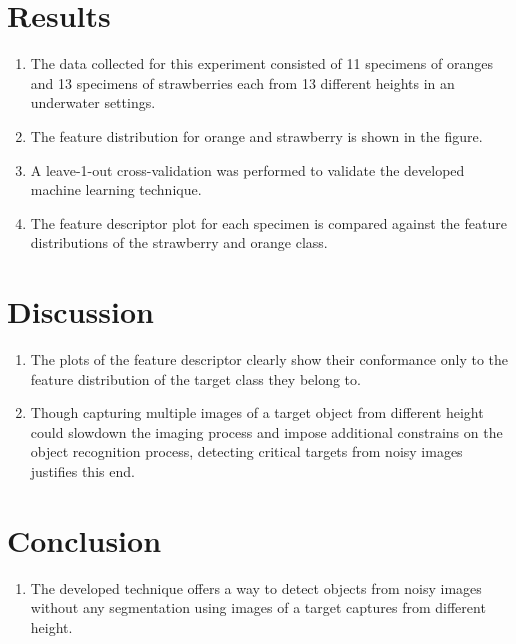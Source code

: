 \documentclass {udthesis}
\begin{document}
\section{Results}
\begin{enumerate}
	\item The data collected for this experiment consisted of 11 specimens of oranges and 13 specimens of strawberries each from 13 different heights in an underwater settings.
	
	\item The feature distribution for orange and strawberry is shown in the figure.
	
	\item A leave-1-out cross-validation was performed to validate the developed machine learning technique.
	
	\item The feature descriptor plot for each specimen is compared against the feature distributions of the strawberry and orange class.
\end{enumerate}

\section{Discussion}
\begin{enumerate}
	\item The plots of the feature descriptor clearly show their conformance only to the feature distribution of the target class they belong to.
	
	\item Though capturing multiple images of a target object from different height could slowdown the imaging process and impose additional constrains on the object recognition process, detecting critical targets from noisy images justifies this end.
\end{enumerate}

\section{Conclusion}
\begin{enumerate}
        \item The developed technique offers a way to detect objects from noisy images without any segmentation using images of a target captures from different height.
\end{enumerate}


\printglossary[type=\acronymtype]                  
\end{document}
